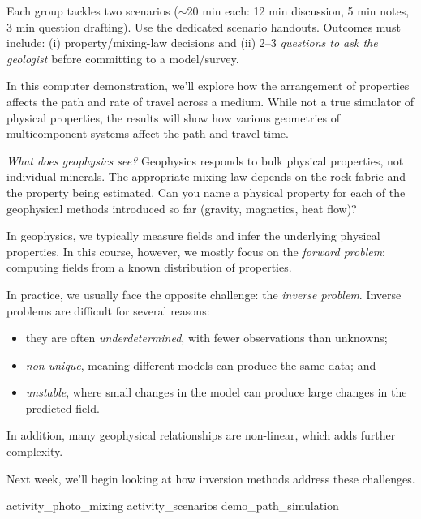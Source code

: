 
Each group tackles two scenarios ($\sim$20 min each: 12 min discussion, 5 min notes, 3 min question drafting). Use the dedicated scenario handouts. Outcomes must include: (i) property/mixing-law decisions and (ii) 2--3 \emph{questions to ask the geologist} before committing to a model/survey.


In this computer demonstration, we'll explore how the arrangement of properties affects the path and rate of travel across a medium.  While not a true simulator of physical properties, the results will show how various geometries of multicomponent systems affect the path and travel-time.


\emph{What does geophysics see?} Geophysics responds to bulk physical properties, not individual minerals. The appropriate mixing law depends on the rock fabric and the property being estimated. Can you name a physical property for each of the geophysical methods introduced so far (gravity, magnetics, heat flow)?


In geophysics, we typically measure fields and infer the underlying physical properties. In this course, however, we mostly focus on the \emph{forward problem}: computing fields from a known distribution of properties.

In practice, we usually face the opposite challenge: the \emph{inverse problem}.
Inverse problems are difficult for several reasons:
\begin{itemize}
  \item they are often \emph{underdetermined}, with fewer observations than unknowns;
  \item \emph{non-unique}, meaning different models can produce the same data; and
  \item \emph{unstable}, where small changes in the model can produce large changes in the predicted field.
\end{itemize}
In addition, many geophysical relationships are non-linear, which adds further complexity.

Next week, we'll begin looking at how inversion methods address these challenges.

\workshopend
\notepage
\notepage

{activity_photo_mixing}
{activity_scenarios}
{demo_path_simulation}